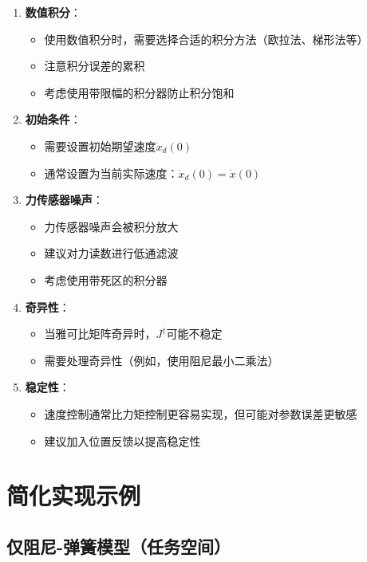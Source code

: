 \documentclass[12pt,a4paper]{article}
\begin{document}
\begin{enumerate}
\item \textbf{数值积分}：
\begin{itemize}
\item 使用数值积分时，需要选择合适的积分方法（欧拉法、梯形法等）
\item 注意积分误差的累积
\item 考虑使用带限幅的积分器防止积分饱和
\end{itemize}

\item \textbf{初始条件}：
\begin{itemize}
\item 需要设置初始期望速度$\dot{x}_d(0)$
\item 通常设置为当前实际速度：$\dot{x}_d(0) = \dot{x}(0)$
\end{itemize}

\item \textbf{力传感器噪声}：
\begin{itemize}
\item 力传感器噪声会被积分放大
\item 建议对力读数进行低通滤波
\item 考虑使用带死区的积分器
\end{itemize}

\item \textbf{奇异性}：
\begin{itemize}
\item 当雅可比矩阵奇异时，$J^{\dagger}$可能不稳定
\item 需要处理奇异性（例如，使用阻尼最小二乘法）
\end{itemize}

\item \textbf{稳定性}：
\begin{itemize}
\item 速度控制通常比力矩控制更容易实现，但可能对参数误差更敏感
\item 建议加入位置反馈以提高稳定性
\end{itemize}
\end{enumerate}

\section{简化实现示例}

\subsection{仅阻尼-弹簧模型（任务空间）}
\end{document}
